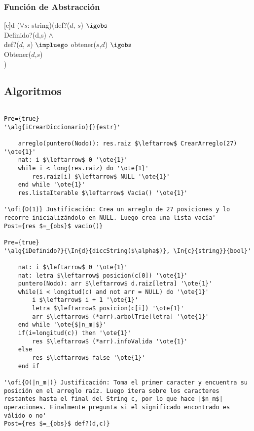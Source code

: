 
\pagebreak

\subsubsection{Funci\'on de Abstracci\'on}

[e]{d}{
($\forall s$: string)(def?($d$, $s$) $\igobs$ \\ Definido?(d,s)
\- $\land$ \\
\- def?($d$, $s$) $\impluego$ obtener($s$,$d$) $\igobs$ \\
\- Obtener($d$,$s$) \\
)
}

\subsection{Algoritmos}

\lstset{style=alg}

\begin{lstlisting}[mathescape]

Pre={true}
'\alg{iCrearDiccionario}{}{estr}'
	
    arreglo(puntero(Nodo)): res.raiz $\leftarrow$ CrearArreglo(27) '\ote{1}'
	nat: i $\leftarrow$ 0 '\ote{1}' 
    while i < long(res.raiz) do '\ote{1}'
    	res.raiz[i] $\leftarrow$ NULL '\ote{1}'
    end while '\ote{1}'
    res.listaIterable $\leftarrow$ Vacia() '\ote{1}'

'\ofi{O(1)} Justificación: Crea un arreglo de 27 posiciones y lo recorre inicializándolo en NULL. Luego crea una lista vacía'
Post={res $=_{obs}$ vacio()}

Pre={true}
'\alg{iDefinido?}{\In{d}{diccString($\alpha$)}, \In{c}{string}}{bool}'

	nat: i $\leftarrow$ 0 '\ote{1}'
	nat: letra $\leftarrow$ posicion(c[0]) '\ote{1}'
	puntero(Nodo): arr $\leftarrow$ d.raiz[letra] '\ote{1}'
	while(i < longitud(c) and not arr = NULL) do '\ote{1}'
		i $\leftarrow$ i + 1 '\ote{1}'
		letra $\leftarrow$ posicion(c[i]) '\ote{1}'
		arr $\leftarrow$ (*arr).arbolTrie[letra] '\ote{1}'
	end while '\ote{$|n_m|$}'
	if(i=longitud(c)) then '\ote{1}'
		res $\leftarrow$ (*arr).infoValida '\ote{1}'
	else
		res $\leftarrow$ false '\ote{1}'
	end if
	
'\ofi{O(|n_m|)} Justificación: Toma el primer caracter y encuentra su posición en el arreglo raíz. Luego itera sobre los caracteres restantes hasta el final del String c, por lo que hace |$n_m$| operaciones. Finalmente pregunta si el significado encontrado es válido o no'
Post={res $=_{obs}$ def?(d,c)}

\end{lstlisting}

